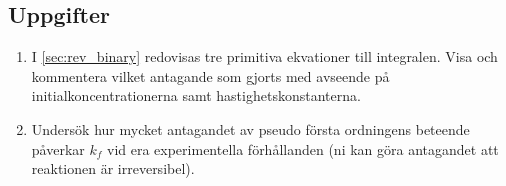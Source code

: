 \subsection{Uppgifter}
\begin{enumerate}
\item I \cref{sec:rev_binary} redovisas tre primitiva ekvationer till
integralen. Visa och kommentera vilket antagande som gjorts med avseende på
initialkoncentrationerna samt hastighetskonstanterna.
\item Undersök hur mycket antagandet av pseudo första ordningens beteende
  påverkar $k_f$ vid era experimentella förhållanden (ni kan göra
  antagandet att reaktionen är irreversibel).
\end{enumerate}

